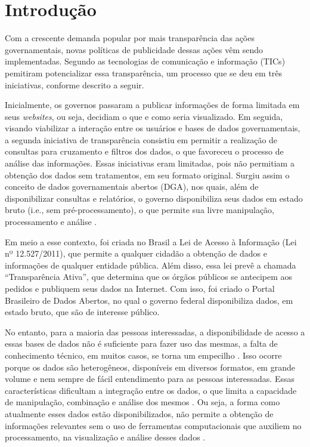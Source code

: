 
\chapter{Introdução}
\label{chap:introducao}

Com a crescente demanda popular por mais transparência das ações governamentais, novas
políticas de publicidade dessas ações vêm sendo implementadas. Segundo 
as tecnologias de comunicação e informação (TICs) pemitiram potencializar essa
transparência, um processo que se deu em três iniciativas, conforme descrito a seguir.

Inicialmente, os governos passaram a publicar informações de forma limitada em seus 
\textit{websites}, ou seja, decidiam o que e como seria visualizado. Em seguida, 
visando viabilizar a interação entre os usuários e bases de dados governamentais, a segunda 
iniciativa de transparência consistiu em permitir a realização de consultas para cruzamento 
e filtros dos dados, o que favoreceu o processo de análise das informações. Essas iniciativas 
eram limitadas, pois não permitiam a obtenção dos dados sem tratamentos, em seu formato original. 
Surgiu assim o conceito de dados governamentais abertos (DGA), nos quais, além de 
disponibilizar consultas e relatórios, o governo disponibiliza seus dados em estado bruto
(i.e., sem pré-processamento), o que permite sua livre manipulação, processamento e 
análise \cite{vaz2010dados}.

Em meio a esse contexto, foi criada no Brasil a Lei de Acesso à Informação 
(Lei nº 12.527/2011), que permite a qualquer cidadão a obtenção de dados e informações 
de qualquer entidade pública. Além disso, essa lei prevê a chamada “Transparência Ativa”, 
que determina que os órgãos públicos se antecipem aos pedidos e publiquem seus dados na 
Internet. Com isso, foi criado o Portal Brasileiro de Dados Abertos, no qual o 
governo federal disponibiliza dados, em estado bruto, que são de interesse público. 

No entanto, para a maioria das pessoas interessadas, a disponibilidade de acesso a essas 
bases de dados não é suficiente para fazer uso das mesmas, a falta de conhecimento técnico, 
em muitos casos, se torna um empecilho \cite{graves2013}. Isso ocorre porque 
os dados são heterogêneos, disponíveis em diversos formatos, em grande 
volume e nem sempre de fácil entendimento para as pessoas interessadas. Essas características 
dificultam a integração entre os dados, o que limita a capacidade de manipulação, 
combinação e análise dos mesmos \cite{hoxha2011open}. Ou seja, a forma como atualmente esses 
dados estão disponibilizados, não permite a obtenção de informações relevantes sem o uso de 
ferramentas computacionais que auxiliem no processamento, na visualização e análise desses 
dados \cite{vaz2010dados}. 

